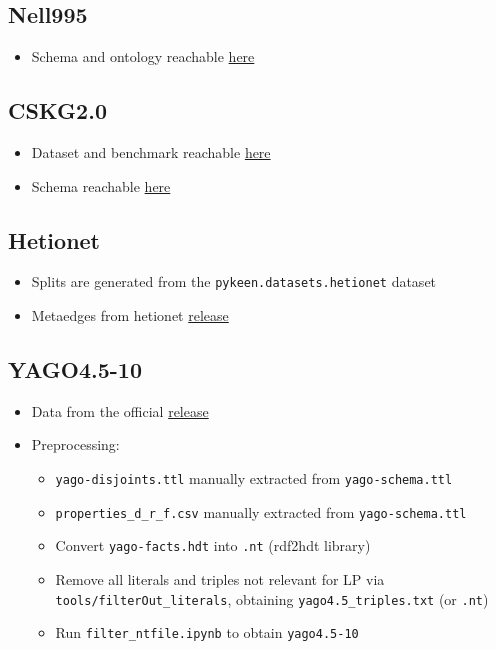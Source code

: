 \documentclass[runningheads]{llncs}
\begin{document}
\subsection*{Nell995}
\begin{itemize}
    \item Schema and ontology reachable \href{https://github.com/bagindokemas/SAIKGC?tab=readme-ov-file}{here}
\end{itemize}

\subsection*{CSKG2.0}
\begin{itemize}
    \item Dataset and benchmark reachable \href{https://doi.org/10.5281/zenodo.14167682}{here}
    \item Schema reachable \href{https://scholkg.kmi.open.ac.uk/cskg/ontology}{here}
\end{itemize}

\subsection*{Hetionet}
\begin{itemize}
    \item Splits are generated from the \texttt{pykeen.datasets.hetionet} dataset
    \item Metaedges from hetionet \href{https://github.com/hetio/hetionet/blob/main/describe/edges/metaedges.tsv}{release}
\end{itemize}

\subsection*{YAGO4.5-10}
\begin{itemize}
    \item Data from the official \href{https://yago-knowledge.org/downloads/yago-4-5}{release}
    \item Preprocessing:
    \begin{itemize}
        \item \texttt{yago-disjoints.ttl} manually extracted from \texttt{yago-schema.ttl}
        \item \texttt{properties\_d\_r\_f.csv} manually extracted from \texttt{yago-schema.ttl}
        \item Convert \texttt{yago-facts.hdt} into \texttt{.nt} (rdf2hdt library)
        \item Remove all literals and triples not relevant for LP via \texttt{tools/filterOut\_literals}, obtaining \texttt{yago4.5\_triples.txt} (or \texttt{.nt})
        \item Run \texttt{filter\_ntfile.ipynb} to obtain \texttt{yago4.5-10}
    \end{itemize}
\end{itemize}
\end{document}
